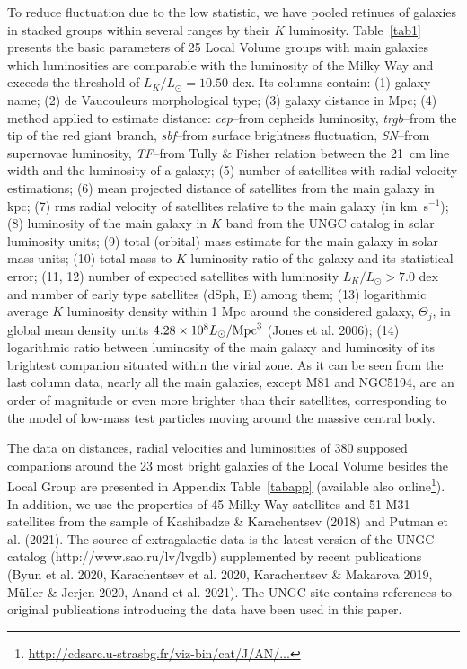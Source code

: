 \documentclass[proof]{WileyASNA-v1}
\begin{document}
To reduce fluctuation due to the low statistic, we have pooled retinues of
galaxies in stacked groups within several ranges by their $K$ luminosity.
Table~\ref{tab1} presents the basic parameters of 25 Local Volume groups with
main galaxies which luminosities are comparable with the luminosity of the Milky
Way and exceeds the threshold of $L_K/L_{\odot}=10.50$ dex. Its columns contain:
(1) galaxy name; (2) de Vaucouleurs morphological type; (3) galaxy distance in
Mpc; (4) method applied to estimate distance: {\itshape cep}--from cepheids
luminosity, {\itshape trgb}--from the tip of the red giant branch, {\itshape
sbf}--from surface brightness fluctuation, {\itshape SN}--from supernovae
luminosity, {\itshape TF}--from Tully \& Fisher relation between the 21~cm line
width and the luminosity of a galaxy; (5) number of satellites with radial
velocity estimations; (6) mean projected distance of satellites from the main
galaxy in kpc; (7) rms radial velocity of satellites relative to the main galaxy
(in km~s$^{-1}$); (8) luminosity of the main galaxy in $K$ band from the UNGC
catalog in solar luminosity units; (9) total (orbital) mass estimate for the
main galaxy in solar mass units; (10) total mass-to-$K$ luminosity ratio of the
galaxy and its statistical error; (11, 12) number of expected satellites with
luminosity $L_K/L_{\odot}>7.0$ dex and number of early type satellites (dSph, E)
among them; (13) logarithmic average $K$ luminosity density within 1 Mpc around
the considered galaxy, $\Theta_j$, in global mean density units
$4.28\times10^8L_{\odot}/{\rm Mpc}^3$ (Jones et al. 2006); (14) logarithmic
ratio between luminosity of the main galaxy and luminosity of its brightest
companion situated within the virial zone. As it can be seen from the last
column data, nearly all the main galaxies, except M81 and NGC5194, are an order
of magnitude or even more brighter than their satellites, corresponding to the
model of low-mass test particles moving around the massive central body.

The data on distances, radial velocities and luminosities of 380 supposed
companions around the 23 most bright galaxies of the Local Volume besides the
Local Group are presented in Appendix Table~\ref{tabapp} (available also
online\footnote{\url{http://cdsarc.u-strasbg.fr/viz-bin/cat/J/AN/...}}). In
addition, we use the properties of 45 Milky Way satellites and 51 M31 satellites
from the sample of Kashibadze \& Karachentsev (2018) and Putman et al. (2021).
The source of extragalactic data is the latest version of the UNGC catalog
(http://www.sao.ru/lv/lvgdb) supplemented by recent publications (Byun et al.
2020, Karachentsev et al. 2020, Karachentsev \& Makarova 2019, M\"{u}ller \&
Jerjen 2020, Anand et al. 2021). The UNGC site contains references to original
publications introducing the data have been used in this paper.
\end{document}
